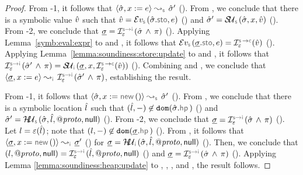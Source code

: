 \begin{proof}
 \noindent {} From \hyp{1}, it follows that $\absbsemrule{\sstate, \jvar := \jsilexpr}{\sstate'}{\symbolic}$ (). 
From , we conclude that there is a symbolic value $\hat{v}$ such that 
$\sexprv = \evalexpr{\symbolic}(\sstate.\stosel, \jsilexpr)$ () and $\sstate' = \stupdt{\symbolic}(\sstate, \jvar, \sexprv)$ (). 
From \hyp{2}, we conclude that $\istate = \interpret{\symbinst}{\senv}(\sstate \, \wedge \, \pc)$ (). 
Applying Lemma~\ref{symb:eval:expr} to  and , it follows that 
$\evalexpr{\symbolic}(\istate.\stosel, \jsilexpr) = \interpret{\symbconc}{\senv}(\sexprv)$ (). 
Applying Lemma~\ref{lemma:soundiness:store:update} to  and , it follows
that $ \interpret{\symbinst}{\senv}(\sstate' \, \wedge \, \pc) = \stupdt{\instrumented}(\istate, \jvar, \interpret{\symbconc}{\senv}(\sexprv))$ (). 
Combining  and , we conclude that $\absbsemrule{\istate,\jvar := \jsilexpr}{\interpret{\symbinst}{\senv}(\sstate' \, \wedge \, \pc)}{\instrumented}$, establishing the result. 
\vspace{5pt}

 \noindent {} From \hyp{1}, it follows that $\absbsemrule{\sstate, \jvar := \jsilnew()}{\sstate'}{\symbolic}$ (). 
From , we conclude that there is a symbolic location $\hat{l}$ such that $(\sloc, -) \not\in \domain(\sstate.\hpsel)$ () and 
$\sstate' = \hpupdt{\symbolic}(\sstate, \sloc, \protop, \jnull)$ (). From \hyp{2}, 
we conclude that $\istate = \interpret{\symbinst}{\senv}(\sstate \, \wedge \, \pc)$ (). 
Let $l = \varepsilon(\hat{l})$; note that $(\loc, -) \not\in \domain(\istate.\hpsel)$ (). 
From , it follows that $\absbsemrule{\istate, \jvar := \jsilnew()}{\istate'}{\instrumented}$ () for 
$\istate = \hpupdt{\instrumented}(\sstate, \sloc, \protop, \jnull)$ (). 
Then, we conclude that 
$(\loc, \protop, \jnull) = \interpret{\symbinst}{\senv}(\sloc, \protop, \jnull)$ ()
and $\istate = \interpret{\symbinst}{\senv}(\sstate \, \wedge \, \pc)$ (). 
Applying Lemma \ref{lemma:soundiness:heap:update} to , , , and , 
the result follows. 
\vspace{5pt}


\end{proof}

